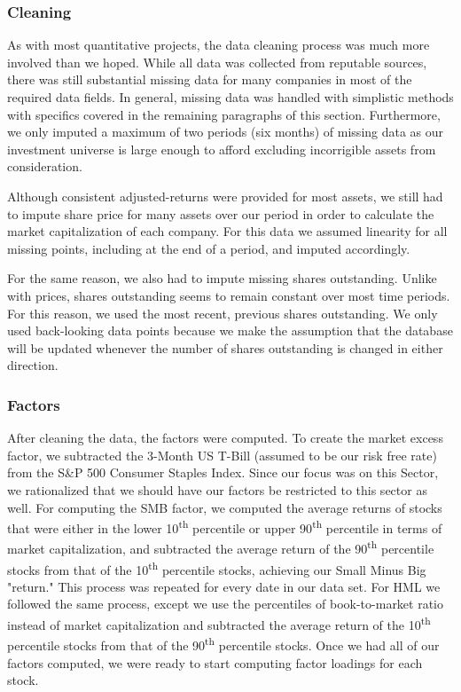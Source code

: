 \documentclass[final]{article}
\begin{document}
\subsubsection{Cleaning}
\hspace{\parindent}As with most quantitative projects, the data cleaning process was much more involved than we hoped. While all data was collected from reputable sources, there was still substantial missing data for many companies in most of the required data fields. In general, missing data was handled with simplistic methods with specifics covered in the remaining paragraphs of this section. Furthermore, we only imputed a maximum of two periods (six months) of missing data as our investment universe is large enough to afford excluding incorrigible assets from consideration.

Although consistent adjusted-returns were provided for most assets, we still had to impute share price for many assets over our period in order to calculate the market capitalization of each company. For this data we assumed linearity for all missing points, including at the end of a period, and imputed accordingly.

For the same reason, we also had to impute missing shares outstanding. Unlike with prices, shares outstanding seems to remain constant over most time periods. For this reason, we used the most recent, previous shares outstanding. We only used back-looking data points because we make the assumption that the database will be updated whenever the number of shares outstanding is changed in either direction.

\subsubsection{Factors}
\hspace{\parindent} After cleaning the data, the factors were computed. To create the market excess factor, we subtracted the 3-Month US T-Bill (assumed to be our risk free rate) from the S\&P 500 Consumer Staples Index. Since our focus was on this Sector, we rationalized that we should have our factors be restricted to this sector as well. For computing the SMB factor, we computed the average returns of stocks that were either in the lower 10\textsuperscript{th} percentile or upper 90\textsuperscript{th} percentile in terms of market capitalization, and subtracted the average return of the 90\textsuperscript{th} percentile stocks from that of the 10\textsuperscript{th} percentile stocks, achieving our Small Minus Big "return." This process was repeated for every date in our data set. For HML we followed the same process, except we use the percentiles of book-to-market ratio instead of market capitalization and subtracted the average return of the 10\textsuperscript{th} percentile stocks from that of the 90\textsuperscript{th} percentile stocks. Once we had all of our factors computed, we were ready to start computing factor loadings for each stock.
\end{document}
